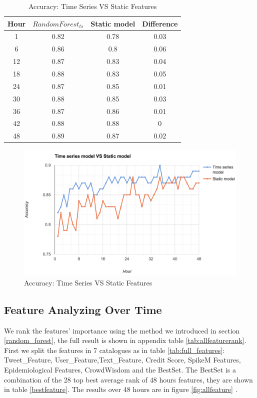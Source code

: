 \begin{table}[!h]
\centering
\begin{tabular}{|c|c c |c|}
\hline
Hour & $Random Forest_{ts}$ & Static model & Difference \\ \hline
1    & 0.82              & 0.78         & 0.03       \\
6    & 0.86              & 0.8          & 0.06       \\
12   & 0.87              & 0.83         & 0.04       \\
18   & 0.88              & 0.83         & 0.05       \\
24   & 0.87              & 0.85         & 0.01       \\
30   & 0.88              & 0.85         & 0.03       \\
36   & 0.87              & 0.86         & 0.01          \\
42   & 0.88              & 0.88         & 0          \\
48   & 0.89              & 0.87         & 0.02      \\\hline

\end{tabular}
\caption{Accuracy: Time Series VS Static Features}
\label{TVSF}
\end{table}

\begin{figure}[!h]
\centering
\includegraphics[width=0.8\columnwidth]{images/Vsstatic.png}
\caption{Accuracy: Time Series VS Static Features}
\label{fig:TVSF}
\end{figure}

  \newpage
 \subsection{Feature Analyzing Over Time} 
 \label{featureanalyzing}
 We rank the features' importance using the method we introduced in section \ref{random_forest}, the full result is shown in appendix table \ref{tab:allfeaturerank}.  First we split the features in 7 catalogues as in table \ref{tab:full_features}: Tweet\_Feature, User\_Feature,Text\_Feature,  Credit Score, SpikeM Features, Epidemiological Features, CrowdWisdom and the BestSet. The BestSet is a combination of the 28 top best average rank of 48 hours features, they are shown in table \ref{bestfeature}. The results over 48 hours are in figure \ref{fig:allfeature} .
 
